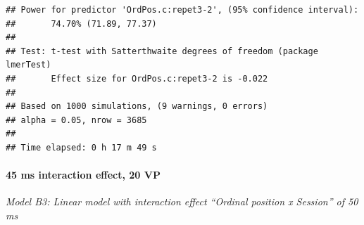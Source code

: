 \documentclass[
]{article}
\newenvironment{Shaded}{\begin{snugshade}}{\end{snugshade}}
\newcommand{\AttributeTok}[1]{\textcolor[rgb]{0.77,0.63,0.00}{#1}}
\newcommand{\CommentTok}[1]{\textcolor[rgb]{0.56,0.35,0.01}{\textit{#1}}}
\newcommand{\DecValTok}[1]{\textcolor[rgb]{0.00,0.00,0.81}{#1}}
\newcommand{\FunctionTok}[1]{\textcolor[rgb]{0.00,0.00,0.00}{#1}}
\newcommand{\NormalTok}[1]{#1}
\newcommand{\OtherTok}[1]{\textcolor[rgb]{0.56,0.35,0.01}{#1}}
\newcommand{\SpecialCharTok}[1]{\textcolor[rgb]{0.00,0.00,0.00}{#1}}
\newcommand{\StringTok}[1]{\textcolor[rgb]{0.31,0.60,0.02}{#1}}
\begin{document}
\begin{verbatim}
## Power for predictor 'OrdPos.c:repet3-2', (95% confidence interval):
##       74.70% (71.89, 77.37)
## 
## Test: t-test with Satterthwaite degrees of freedom (package lmerTest)
##       Effect size for OrdPos.c:repet3-2 is -0.022
## 
## Based on 1000 simulations, (9 warnings, 0 errors)
## alpha = 0.05, nrow = 3685
## 
## Time elapsed: 0 h 17 m 49 s
\end{verbatim}

\hypertarget{ms-interaction-effect-20-vp-1}{%
\paragraph{45 ms interaction effect, 20
VP}\label{ms-interaction-effect-20-vp-1}}

\begin{Shaded}
\end{Shaded}

\emph{Model B3: Linear model with interaction effect ``Ordinal position
x Session'' of 50 ms}

\begin{Shaded}
\end{Shaded}
\end{document}
